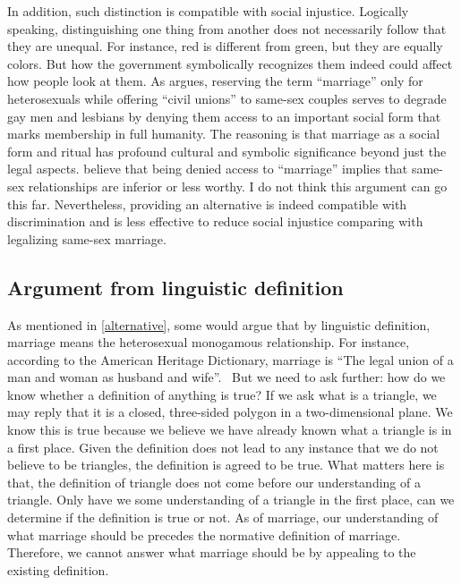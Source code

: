 \documentclass{article}
\begin{document}
In addition, such distinction is compatible with social injustice. Logically speaking, distinguishing one thing from another does not necessarily follow that they are unequal. For instance, red is different from green, but they are equally colors. But how the government symbolically recognizes them indeed could affect how people look at them. As \textcite{mohrLongArcJustice2007} argues, reserving the term ``marriage'' only for heterosexuals while offering ``civil unions'' to same-sex couples serves to degrade gay men and lesbians by denying them access to an important social form that marks membership in full humanity. The reasoning is that marriage as a social form and ritual has profound cultural and symbolic significance beyond just the legal aspects.  believe that being denied access to ``marriage'' implies that same-sex relationships are inferior or less worthy. I do not think this argument can go this far. Nevertheless, providing an alternative is indeed compatible with discrimination and is less effective to reduce social injustice comparing with legalizing same-sex marriage.


\subsection{Argument from linguistic definition}

As mentioned in \ref{alternative}, some would argue that by linguistic definition, marriage means the heterosexual monogamous relationship. For instance, according to the American Heritage Dictionary, marriage is ``The legal union of a man and woman as husband and wife''.~\autocite{pickertAmericanHeritageDictionary2000} But we need to ask further: how do we know whether a definition of anything is true? If we ask what is a triangle, we may reply that it is a closed, three-sided polygon in a two-dimensional plane. We know this is true because we believe we have already known what a triangle is in a first place. Given the definition does not lead to any instance that we do not believe to be triangles, the definition is agreed to be true. What matters here is that, the definition of triangle does not come before our understanding of a triangle. Only have we some understanding of a triangle in the first place, can we determine if the definition is true or not. As of marriage, our understanding of what marriage should be precedes the normative definition of marriage. Therefore, we cannot answer what marriage should be by appealing to the existing definition.
\end{document}
